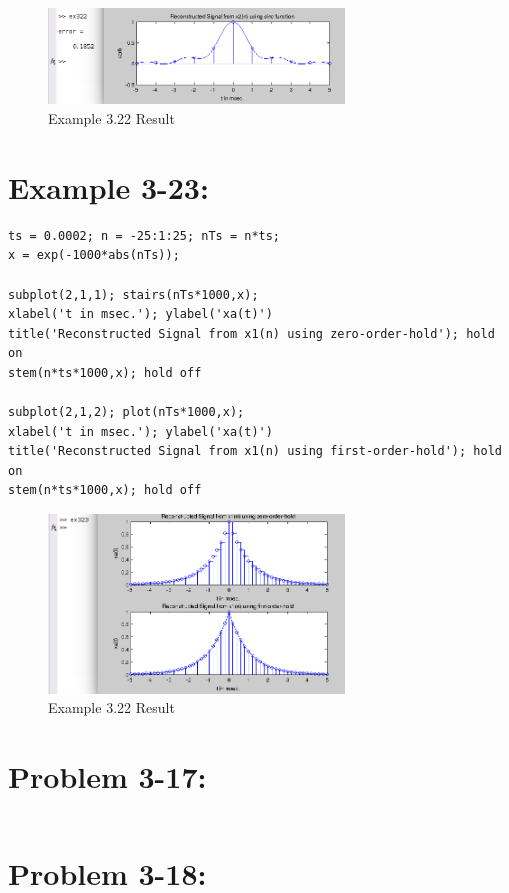\documentclass[11pt
  , a4paper
  , article
  , oneside
]{memoir}
\begin{document}
\begin{figure}[h!]
	\centering
	\includegraphics[width=0.7\textwidth,height=0.4\textwidth]{./images/ex322.png}
	\caption{Example 3.22 Result}
	\label{fig:Example 3-22 Result}
\end{figure}

\chapter{Example 3-23:}
\begin{lstlisting}[style=termstyle]
% Example 3.23
ts = 0.0002; n = -25:1:25; nTs = n*ts;
x = exp(-1000*abs(nTs));

subplot(2,1,1); stairs(nTs*1000,x);
xlabel('t in msec.'); ylabel('xa(t)')
title('Reconstructed Signal from x1(n) using zero-order-hold'); hold on
stem(n*ts*1000,x); hold off

subplot(2,1,2); plot(nTs*1000,x);
xlabel('t in msec.'); ylabel('xa(t)')
title('Reconstructed Signal from x1(n) using first-order-hold'); hold on
stem(n*ts*1000,x); hold off
\end{lstlisting}

\begin{figure}[h!]
	\centering
	\includegraphics[width=0.7\textwidth,height=0.4\textwidth]{./images/ex323.png}
	\caption{Example 3.22 Result}
	\label{fig:Example 3-23 Result}
\end{figure}

\clearpage

\chapter{Problem 3-17:}
\begin{lstlisting}[style=termstyle]
%Problem 3.17

\end{lstlisting}


\chapter{Problem 3-18:}
\begin{lstlisting}[style=termstyle]
%Problem 3.18

\end{lstlisting}
\end{document}
